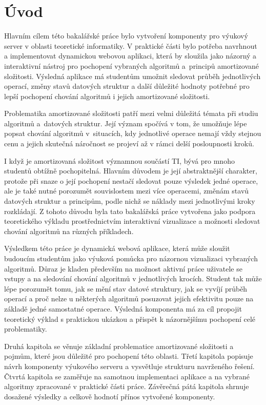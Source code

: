 \chapter{Úvod}
Hlavním cílem této bakalářské práce bylo vytvoření komponenty pro výukový server v oblasti teoretické informatiky. V praktické části bylo potřeba navrhnout a implementovat dynamickou webovou aplikaci, která by sloužila jako názorný a interaktivní nástroj pro pochopení vybraných algoritmů a~principů amortizované složitosti. Výsledná aplikace má studentům umožnit sledovat průběh jednotlivých operací, změny stavů datových struktur a další důležité hodnoty potřebné pro lepší pochopení chování algoritmů i jejich amortizované složitosti.

Problematika amortizované složitosti patří mezi velmi důležitá témata při studiu algoritmů a~datových struktur. Její význam spočívá v tom, že umožňuje lépe popsat chování algoritmů v~situacích, kdy jednotlivé operace nemají vždy stejnou cenu a jejich skutečná náročnost se projeví až v rámci delší posloupnosti kroků.

I když je amortizovaná složitost významnou součástí TI, bývá pro mnoho studentů obtížně pochopitelná. Hlavním důvodem je její abstraktnější charakter, protože při snaze o její pochopení nestačí sledovat pouze výsledek jedné operace, ale je také nutné porozumět souvislostem mezi více operacemi, změnám stavů datových struktur a principům, podle nichž se náklady mezi jednotlivými kroky rozkládají. Z tohoto důvodu byla tato bakalářská práce vytvořena jako podpora teoretického výkladu prostřednictvím interaktivní vizualizace a možnosti sledovat chování algoritmů na různých příkladech.

Výsledkem této práce je dynamická webová aplikace, která může sloužit budoucím studentům jako výuková pomůcka pro názornou vizualizaci vybraných algoritmů. Důraz je kladen především na možnost aktivní práce uživatele se vstupy a na sledování chování algoritmů v jednotlivých krocích. Student tak může lépe porozumět tomu, jak se mění stav datové struktury, jak se vyvíjí průběh operací a proč nelze u některých algoritmů posuzovat jejich efektivitu pouze na základě jedné samostatné operace. Výsledná komponenta má za cíl propojit teoretický výklad s praktickou ukázkou a přispět k názornějšímu pochopení celé problematiky.
\newpage

Druhá kapitola se věnuje základní problematice amortizované složitosti a pojmům, které jsou důležité pro pochopení této oblasti. Třetí kapitola popisuje návrh komponenty výukového serveru a vysvětluje strukturu navrženého řešení. Čtvrtá kapitola se zaměřuje na samotnou implementaci aplikace a na vybrané algoritmy zpracované v praktické části práce. Závěrečná pátá kapitola shrnuje dosažené výsledky a celkově hodnotí přínos vytvořené komponenty.